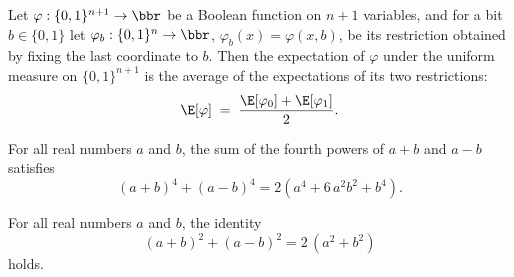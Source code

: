 \begin{lemma}
\label{BooleanAnalysis.Hypercontractivity.expect_succ_eq}
\leanok
{}
Let $\varphi : \{0,1\}^{n+1} \to \bbr$ be a Boolean function on $n+1$ variables, and for
a bit $b \in \{0,1\}$ let $\varphi_b : \{0,1\}^n \to \bbr$, $\varphi_b(x) = \varphi(x,
b)$, be its restriction obtained by fixing the last coordinate to $b$. Then the
expectation of $\varphi$ under the uniform measure on $\{0,1\}^{n+1}$ is the average of
the expectations of its two restrictions:
\[
  \E[\varphi] \;=\; \frac{\E[\varphi_{0}] + \E[\varphi_{1}]}{2}.
\]
\end{lemma}

\begin{lemma}
\label{BooleanAnalysis.Hypercontractivity.fourth_pow_sum}
\leanok
{}
For all real numbers $a$ and $b$, the sum of the fourth powers of $a+b$ and $a-b$
satisfies
\[
(a+b)^4 + (a-b)^4 = 2\left(a^4 + 6\,a^2 b^2 + b^4\right).
\]
\end{lemma}

\begin{lemma}
\label{BooleanAnalysis.Hypercontractivity.second_pow_sum}
\leanok
{}
For all real numbers $a$ and $b$, the identity \[(a+b)^2 + (a-b)^2 = 2\,(a^2 + b^2)\]
holds.
\end{lemma}

